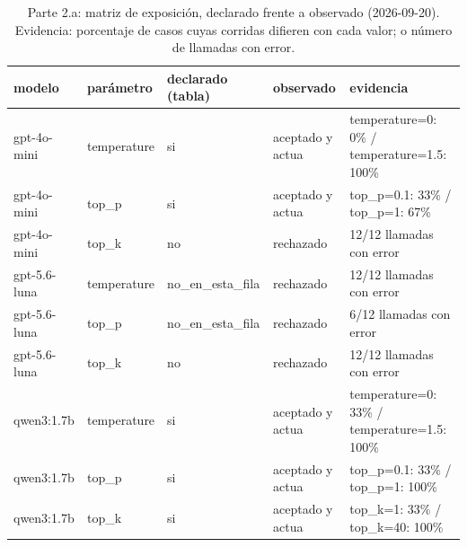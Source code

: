\begin{table}[H]\centering\caption{Parte 2.a: matriz de exposición, declarado frente a observado (2026-09-20). Evidencia: porcentaje de casos cuyas corridas difieren con cada valor; o número de llamadas con error.}\label{tab:p2a}
{\footnotesize\setlength{\tabcolsep}{3.5pt}
\begin{tabular}{@{}lllp{2.0cm}p{3.3cm}@{}}
\hline
modelo & parámetro & declarado (tabla) & observado & evidencia \\
\hline
gpt-4o-mini & temperature & si & aceptado y actua & temperature=0: 0\% / temperature=1.5: 100\% \\
gpt-4o-mini & top\_p & si & aceptado y actua & top\_p=0.1: 33\% / top\_p=1: 67\% \\
gpt-4o-mini & top\_k & no & rechazado & 12/12 llamadas con error \\
gpt-5.6-luna & temperature & no\_en\_esta\_fila & rechazado & 12/12 llamadas con error \\
gpt-5.6-luna & top\_p & no\_en\_esta\_fila & rechazado & 6/12 llamadas con error \\
gpt-5.6-luna & top\_k & no & rechazado & 12/12 llamadas con error \\
qwen3:1.7b & temperature & si & aceptado y actua & temperature=0: 33\% / temperature=1.5: 100\% \\
qwen3:1.7b & top\_p & si & aceptado y actua & top\_p=0.1: 33\% / top\_p=1: 100\% \\
qwen3:1.7b & top\_k & si & aceptado y actua & top\_k=1: 33\% / top\_k=40: 100\% \\
\hline
\end{tabular}
}\end{table}
